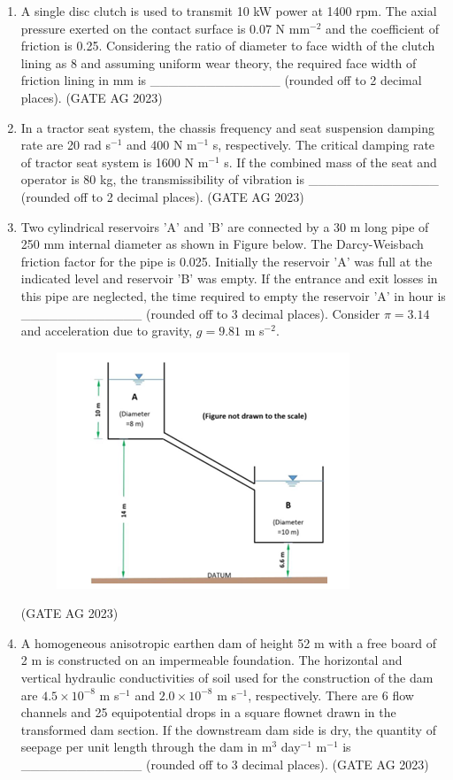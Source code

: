 \documentclass[journal,12pt,onecolumn]{IEEEtran}
\theoremstyle{remark}
\begin{document}
\begin{enumerate}
    \item A single disc clutch is used to transmit 10 kW power at 1400 rpm. The axial pressure exerted on the contact surface is 0.07 N mm$^{-2}$ and the coefficient of friction is 0.25. Considering the ratio of diameter to face width of the clutch lining as 8 and assuming uniform wear theory, the required face width of friction lining in mm is \_\_\_\_\_\_\_\_\_\_\_\_\_\_ (rounded off to 2 decimal places).
\hfill{(GATE AG 2023)}

    \item In a tractor seat system, the chassis frequency and seat suspension damping rate are 20 rad s$^{-1}$ and 400 N m$^{-1}$ s, respectively. The critical damping rate of tractor seat system is 1600 N m$^{-1}$ s. If the combined mass of the seat and operator is 80 kg, the transmissibility of vibration is \_\_\_\_\_\_\_\_\_\_\_\_\_\_ (rounded off to 2 decimal places).
\hfill{(GATE AG 2023)}

    \item Two cylindrical reservoirs 'A' and 'B' are connected by a 30 m long pipe of 250 mm internal diameter as shown in Figure below. The Darcy-Weisbach friction factor for the pipe is 0.025. Initially the reservoir 'A' was full at the indicated level and reservoir 'B' was empty. If the entrance and exit losses in this pipe are neglected, the time required to empty the reservoir 'A' in hour is \_\_\_\_\_\_\_\_\_\_\_\_\_ (rounded off to 3 decimal places).
    Consider $\pi = 3.14$ and acceleration due to gravity, $g = 9.81$ m s$^{-2}$.

\begin{figure}[H]
    \centering
    \includegraphics[]{figs/Q.57.png}
    \caption{}
    \label{fig:3}
\end{figure}
\hfill{(GATE AG 2023)}

    \item A homogeneous anisotropic earthen dam of height 52 m with a free board of 2 m is constructed on an impermeable foundation. The horizontal and vertical hydraulic conductivities of soil used for the construction of the dam are $4.5 \times 10^{-8}$ m s$^{-1}$ and $2.0 \times 10^{-8}$ m s$^{-1}$, respectively. There are 6 flow channels and 25 equipotential drops in a square flownet drawn in the transformed dam section. If the downstream dam side is dry, the quantity of seepage per unit length through the dam in m$^{3}$ day$^{-1}$ m$^{-1}$ is \_\_\_\_\_\_\_\_\_\_\_\_\_ (rounded off to 3 decimal places).
\hfill{(GATE AG 2023)}


\end{enumerate}
\end{document}
